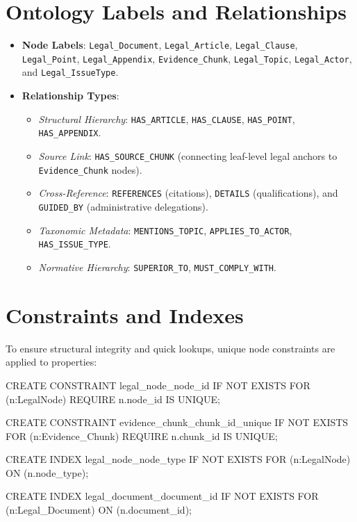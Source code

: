 \section{Ontology Labels and Relationships}
\begin{itemize}
  \item \textbf{Node Labels}: \texttt{Legal\_Document}, \texttt{Legal\_Article}, \texttt{Legal\_Clause}, \texttt{Legal\_Point}, \texttt{Legal\_Appendix}, \texttt{Evidence\_Chunk}, \texttt{Legal\_Topic}, \texttt{Legal\_Actor}, and \texttt{Legal\_IssueType}.
  \item \textbf{Relationship Types}: 
    \begin{itemize}
      \item \textit{Structural Hierarchy}: \texttt{HAS\_ARTICLE}, \texttt{HAS\_CLAUSE}, \texttt{HAS\_POINT}, \texttt{HAS\_APPENDIX}.
      \item \textit{Source Link}: \texttt{HAS\_SOURCE\_CHUNK} (connecting leaf-level legal anchors to \texttt{Evidence\_Chunk} nodes).
      \item \textit{Cross-Reference}: \texttt{REFERENCES} (citations), \texttt{DETAILS} (qualifications), and \texttt{GUIDED\_BY} (administrative delegations).
      \item \textit{Taxonomic Metadata}: \texttt{MENTIONS\_TOPIC}, \texttt{APPLIES\_TO\_ACTOR}, \texttt{HAS\_ISSUE\_TYPE}.
      \item \textit{Normative Hierarchy}: \texttt{SUPERIOR\_TO}, \texttt{MUST\_COMPLY\_WITH}.
    \end{itemize}
\end{itemize}

\section{Constraints and Indexes}
To ensure structural integrity and quick lookups, unique node constraints are applied to properties:
\begin{ThesisCode}
CREATE CONSTRAINT legal_node_node_id IF NOT EXISTS
FOR (n:LegalNode) REQUIRE n.node_id IS UNIQUE;

CREATE CONSTRAINT evidence_chunk_chunk_id_unique IF NOT EXISTS
FOR (n:Evidence_Chunk) REQUIRE n.chunk_id IS UNIQUE;

CREATE INDEX legal_node_node_type IF NOT EXISTS
FOR (n:LegalNode) ON (n.node_type);

CREATE INDEX legal_document_document_id IF NOT EXISTS
FOR (n:Legal_Document) ON (n.document_id);
\end{ThesisCode}

